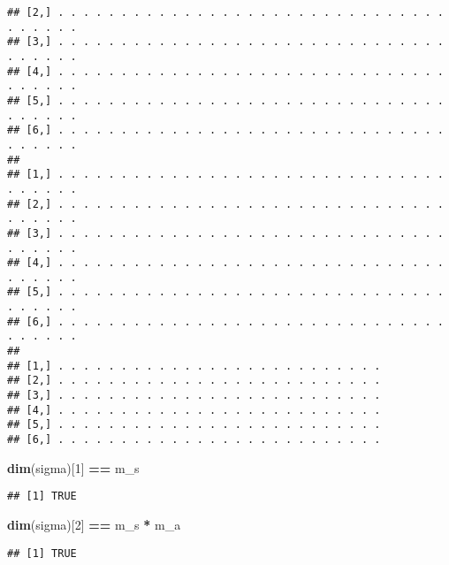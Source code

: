 \documentclass[
]{book}
\newenvironment{Shaded}{\begin{snugshade}}{\end{snugshade}}
\newcommand{\DecValTok}[1]{\textcolor[rgb]{0.00,0.00,0.81}{#1}}
\newcommand{\FunctionTok}[1]{\textcolor[rgb]{0.13,0.29,0.53}{\textbf{#1}}}
\newcommand{\NormalTok}[1]{#1}
\newcommand{\SpecialCharTok}[1]{\textcolor[rgb]{0.81,0.36,0.00}{\textbf{#1}}}
\begin{document}
\begin{verbatim}
## [2,] . . . . . . . . . . . . . . . . . . . . . . . . . . . . . . . . . . . . .
## [3,] . . . . . . . . . . . . . . . . . . . . . . . . . . . . . . . . . . . . .
## [4,] . . . . . . . . . . . . . . . . . . . . . . . . . . . . . . . . . . . . .
## [5,] . . . . . . . . . . . . . . . . . . . . . . . . . . . . . . . . . . . . .
## [6,] . . . . . . . . . . . . . . . . . . . . . . . . . . . . . . . . . . . . .
##                                                                               
## [1,] . . . . . . . . . . . . . . . . . . . . . . . . . . . . . . . . . . . . .
## [2,] . . . . . . . . . . . . . . . . . . . . . . . . . . . . . . . . . . . . .
## [3,] . . . . . . . . . . . . . . . . . . . . . . . . . . . . . . . . . . . . .
## [4,] . . . . . . . . . . . . . . . . . . . . . . . . . . . . . . . . . . . . .
## [5,] . . . . . . . . . . . . . . . . . . . . . . . . . . . . . . . . . . . . .
## [6,] . . . . . . . . . . . . . . . . . . . . . . . . . . . . . . . . . . . . .
##                                                         
## [1,] . . . . . . . . . . . . . . . . . . . . . . . . . .
## [2,] . . . . . . . . . . . . . . . . . . . . . . . . . .
## [3,] . . . . . . . . . . . . . . . . . . . . . . . . . .
## [4,] . . . . . . . . . . . . . . . . . . . . . . . . . .
## [5,] . . . . . . . . . . . . . . . . . . . . . . . . . .
## [6,] . . . . . . . . . . . . . . . . . . . . . . . . . .
\end{verbatim}

\begin{Shaded}
\begin{Highlighting}[]
\FunctionTok{dim}\NormalTok{(sigma)[}\DecValTok{1}\NormalTok{] }\SpecialCharTok{==}\NormalTok{ m\_s}
\end{Highlighting}
\end{Shaded}

\begin{verbatim}
## [1] TRUE
\end{verbatim}

\begin{Shaded}
\begin{Highlighting}[]
\FunctionTok{dim}\NormalTok{(sigma)[}\DecValTok{2}\NormalTok{] }\SpecialCharTok{==}\NormalTok{ m\_s }\SpecialCharTok{*}\NormalTok{ m\_a}
\end{Highlighting}
\end{Shaded}

\begin{verbatim}
## [1] TRUE
\end{verbatim}
\end{document}
